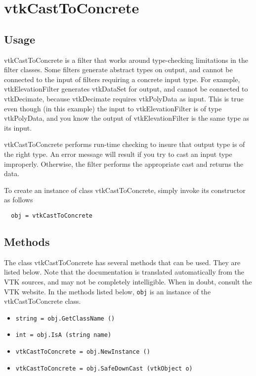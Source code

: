 \section{vtkCastToConcrete}

\subsection{Usage}

 vtkCastToConcrete is a filter that works around type-checking limitations
 in the filter classes. Some filters generate abstract types on output, 
 and cannot be connected to the input of filters requiring a concrete
 input type. For example, vtkElevationFilter generates vtkDataSet for output,
 and cannot be connected to vtkDecimate, because vtkDecimate requires 
 vtkPolyData as input. This is true even though (in this example) the input 
 to vtkElevationFilter is of type vtkPolyData, and you know the output of 
 vtkElevationFilter is the same type as its input.

 vtkCastToConcrete performs run-time checking to insure that output type
 is of the right type. An error message will result if you try to cast
 an input type improperly. Otherwise, the filter performs the appropriate
 cast and returns the data.

To create an instance of class vtkCastToConcrete, simply
invoke its constructor as follows
\begin{verbatim}
  obj = vtkCastToConcrete
\end{verbatim}
\subsection{Methods}

The class vtkCastToConcrete has several methods that can be used.
  They are listed below.
Note that the documentation is translated automatically from the VTK sources,
and may not be completely intelligible.  When in doubt, consult the VTK website.
In the methods listed below, \verb|obj| is an instance of the vtkCastToConcrete class.
\begin{itemize}
\item  \verb|string = obj.GetClassName ()|

\item  \verb|int = obj.IsA (string name)|

\item  \verb|vtkCastToConcrete = obj.NewInstance ()|

\item  \verb|vtkCastToConcrete = obj.SafeDownCast (vtkObject o)|

\end{itemize}
